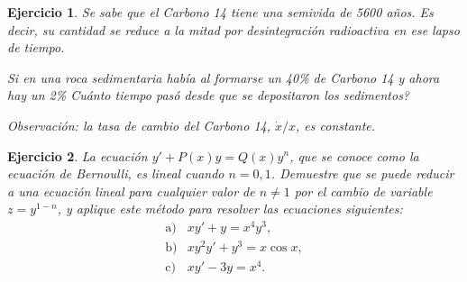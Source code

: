 \documentclass[11pt,a4paper,pdftex]{amsart}
\newtheorem{ej}{Ejercicio}%
\newcommand{\bej}[1]{\begin{ej}\rm{#1}}
\newcommand{\eej}{\end{ej}\vspace{-0.2cm}}
\newcommand{\0}{\mathbb O}
\newcommand{\8}{\infty}
\begin{document}
\bej Se sabe que el Carbono 14 tiene una semivida de 5600 años. Es decir, su cantidad
se reduce a la mitad por desintegración radioactiva en ese lapso de tiempo.

Si en una roca sedimentaria había al formarse un 40\% de Carbono 14 y ahora hay un 2\%
\textquestiondown Cuánto tiempo pasó desde que se depositaron los sedimentos?

Observación: la tasa de cambio del Carbono 14, $\dot x/x$, es constante.
\eej

\bigskip


\bej La ecuaci\'on $y'+P(x) y =Q(x) y^{n}$, que se conoce como la
ecuaci\'on de Bernoulli, es lineal cuando $n=0,1$. Demuestre que
se puede reducir a una ecuaci\'on lineal para cualquier valor de
$n \ne 1$ por el cambio de variable $z=y^{1-n}$, y aplique este
m\'etodo para resolver las ecuaciones siguientes:
\[
\begin{array}{ll}
\mbox{a)}&xy'+y=x^{4}y^{3},\\
\mbox{b)}&xy^{2}y'+y^{3}=x \cos x,\\
\mbox{c)}&x y'-3y=x^{4}.
\end{array}
\]
\eej
\end{document}
